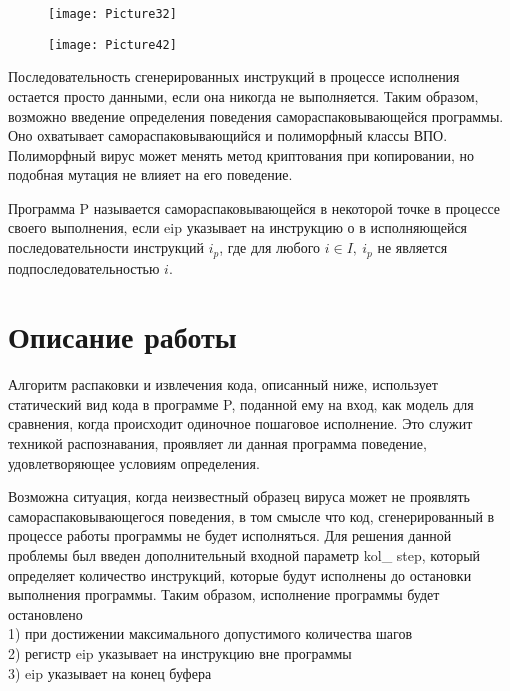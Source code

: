 \documentclass[oneside, final, 14pt]{extreport}
\begin{document}
\begin{figure}[t]
	\centering
	\texttt{[image: Picture32]}
	\caption{}
	\label{truck_figure}
\end{figure}

\begin{figure}[t]
	\centering
	\texttt{[image: Picture42]}
	\caption{}
	\label{truck_figure}
\end{figure}

Последовательность сгенерированных инструкций в процессе исполнения остается просто данными, если она никогда не выполняется. Таким образом, возможно введение определения поведения самораспаковывающейся программы. Оно охватывает самораспаковывающийся и полиморфный классы ВПО. Полиморфный вирус может менять метод криптования при копировании, но подобная мутация не влияет на его поведение.

Программа P называется самораспаковывающейся в некоторой точке в процессе своего выполнения, если eip указывает на инструкцию о в исполняющейся последовательности инструкций \(i_p\), где для любого \(i \in I,\ i_p\) не является подпоследовательностью \(i\).

\section{Описание работы}

Алгоритм распаковки и извлечения кода, описанный ниже, использует статический вид кода в программе P, поданной ему на вход, как модель для сравнения, когда происходит одиночное пошаговое исполнение. Это служит техникой распознавания, проявляет ли данная программа поведение, удовлетворяющее условиям определения.

Возможна ситуация, когда неизвестный образец вируса может не проявлять самораспаковывающегося поведения, в том смысле что код, сгенерированный в процессе работы программы не будет исполняться. Для решения данной проблемы был введен дополнительный входной параметр kol\_ step, который определяет количество инструкций, которые будут исполнены до остановки выполнения программы. Таким образом, исполнение программы будет остановлено 
\\1) при достижении максимального допустимого количества шагов \\ 2) регистр eip указывает на инструкцию вне программы \\ 3) eip указывает на конец буфера
\end{document}
